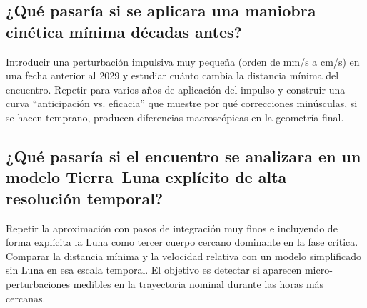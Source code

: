 \subsection{¿Qué pasaría si se aplicara una maniobra cinética mínima décadas antes?}

Introducir una perturbación impulsiva muy pequeña (orden de mm/s a cm/s) en una fecha anterior al 2029 y estudiar cuánto cambia la distancia mínima del encuentro. Repetir para varios años de aplicación del impulso y construir una curva ``anticipación vs. eficacia'' que muestre por qué correcciones minúsculas, si se hacen temprano, producen diferencias macroscópicas en la geometría final.

\subsection{¿Qué pasaría si el encuentro se analizara en un modelo Tierra--Luna explícito de alta resolución temporal?}

Repetir la aproximación con pasos de integración muy finos e incluyendo de forma explícita la Luna como tercer cuerpo cercano dominante en la fase crítica. Comparar la distancia mínima y la velocidad relativa con un modelo simplificado sin Luna en esa escala temporal. El objetivo es detectar si aparecen micro-perturbaciones medibles en la trayectoria nominal durante las horas más cercanas.
